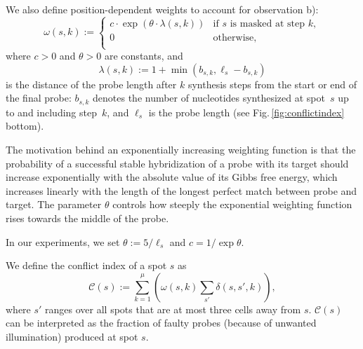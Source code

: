 \documentclass{llncs}
\newcommand{\ignore}[1]{}
\begin{document}
We also define position-dependent weights to account for observation b):
\begin{equation}\label{eq:pos_mult}
\omega(s,k) :=
\left\{
  \begin{array}{ll}
    c \cdot \exp{\left(\theta \cdot \lambda(s,k)\right)} & \mbox{if $s$ is masked at step $k$}, \\
    0 & \mbox{otherwise}, \\
  \end{array}
\right.
\end{equation}
where $c>0$ and $\theta>0$ are constants, and
\begin{equation}\label{eq:base_pos}
  \lambda(s,k) := 1 + \min(b_{s,k},\ell_{s} - b_{s,k})
\end{equation}
is the distance of the probe length after $k$ synthesis steps
from the start or end of the final probe: $b_{s,k}$ denotes the number of
nucleotides synthesized at spot~$s$ up to and including step~$k$, and
$\ell_s$ is the probe length (see Fig.\,\ref{fig:conflictindex}
bottom).

The motivation behind an exponentially increasing weighting function is that
the probability of a successful stable hybridization of a probe with its
target should increase exponentially with the absolute value of its Gibbs free
energy, which increases linearly with the length of the longest perfect match
between probe and target. The parameter $\theta$ controls how steeply the
exponential weighting function rises towards the middle of the probe.
%
\ignore{It is generally agreed that the chances of a successful hybridization
  between probe and target are higher if a mismatched base occurs at the
  extremities of the formed duplex instead of at its center. The precise
  effects of this position, however, is not yet fully understood and has been
  an active topic of research \cite{BINDER05}.}
%
In our experiments, we set $\theta := 5/\ell_s$ and $c = 1/\exp{\theta}$.


We define the conflict index of a spot $s$ as
\begin{equation}
\label{eq:conf_idx}
\mathcal{C}(s) := \sum_{k=1}^{\mu} \left( \omega(s,k) \sum_{s'} \delta(s,s',k) \right),
\end{equation}
where $s'$ ranges over all spots that are at most three cells away
from $s$.  $\mathcal{C}(s)$ can be interpreted as the fraction of
faulty probes (because of unwanted illumination) produced at spot $s$.
\end{document}
